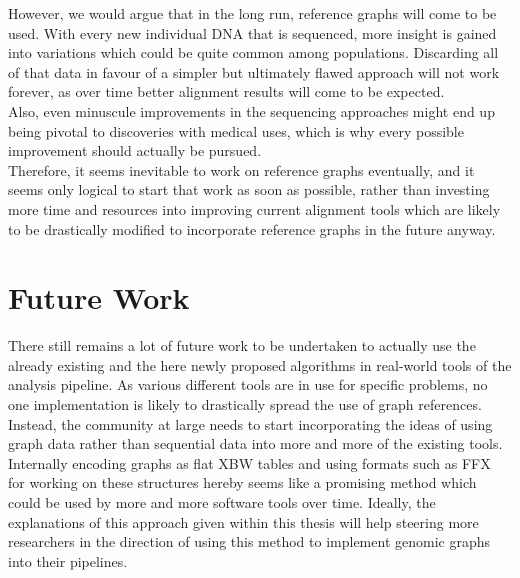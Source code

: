 \documentclass[a4paper,12pt,twoside,BCOR=10mm]{scrbook}
\begin{document}
However, we would argue that in the long run, reference graphs will come to be used.
With every new individual DNA that is sequenced, more insight is gained into
variations which could be quite common among populations.
Discarding all of that data in favour of a simpler but ultimately flawed approach
will not work forever, as over time better alignment results will come to be expected. \\
Also, even minuscule improvements in the sequencing approaches 
might end up being pivotal to discoveries with medical uses, 
which is why every possible improvement should actually be pursued. \\
Therefore, it seems inevitable to work on reference graphs eventually,
and it seems only logical to start that work as soon as possible, rather than investing
more time and resources into improving current alignment tools which are likely to be drastically
modified to incorporate reference graphs in the future anyway.

\section{Future Work}

There still remains a lot of future work to be undertaken to actually use
the already existing and the here newly proposed algorithms in real-world
tools of the analysis pipeline.
%
%
As various different tools are in use for specific problems, no one implementation
is likely to drastically spread the use of graph references.
Instead, the community at large needs to start
incorporating the ideas of using graph data rather than sequential data into
more and more of the existing tools. \\
Internally encoding graphs as flat XBW tables and using formats such as FFX for working on
these structures hereby seems like a promising method which could be used by more and
more software tools over time. Ideally, the explanations of this approach given within this
thesis will help steering more researchers in the direction of using this method to implement
genomic graphs into their pipelines.



\appendix
\renewcommand{\chaptername}{Appendix}
\end{document}
